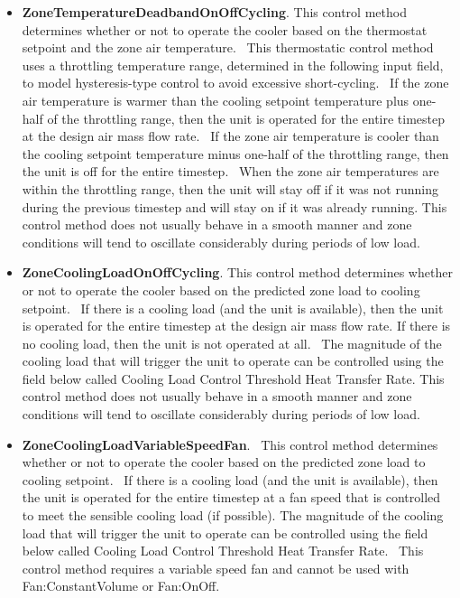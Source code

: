 \begin{itemize}
\item
  \textbf{ZoneTemperatureDeadbandOnOffCycling}. This control method determines whether or not to operate the cooler based on the thermostat setpoint and the zone air temperature.~ This thermostatic control method uses a throttling temperature range, determined in the following input field, to model hysteresis-type control to avoid excessive short-cycling.~ If the zone air temperature is warmer than the cooling setpoint temperature plus one-half of the throttling range, then the unit is operated for the entire timestep at the design air mass flow rate.~ If the zone air temperature is cooler than the cooling setpoint temperature minus one-half of the throttling range, then the unit is off for the entire timestep.~ When the zone air temperatures are within the throttling range, then the unit will stay off if it was not running during the previous timestep and will stay on if it was already running. This control method does not usually behave in a smooth manner and zone conditions will tend to oscillate considerably during periods of low load.
\item
  \textbf{ZoneCoolingLoadOnOffCycling}. This control method determines whether or not to operate the cooler based on the predicted zone load to cooling setpoint.~ If there is a cooling load (and the unit is available), then the unit is operated for the entire timestep at the design air mass flow rate. If there is no cooling load, then the unit is not operated at all.~ The magnitude of the cooling load that will trigger the unit to operate can be controlled using the field below called Cooling Load Control Threshold Heat Transfer Rate. This control method does not usually behave in a smooth manner and zone conditions will tend to oscillate considerably during periods of low load.
\item
  \textbf{ZoneCoolingLoadVariableSpeedFan}.~ This control method determines whether or not to operate the cooler based on the predicted zone load to cooling setpoint.~ If there is a cooling load (and the unit is available), then the unit is operated for the entire timestep at a fan speed that is controlled to meet the sensible cooling load (if possible). The magnitude of the cooling load that will trigger the unit to operate can be controlled using the field below called Cooling Load Control Threshold Heat Transfer Rate.~ This control method requires a variable speed fan and cannot be used with Fan:ConstantVolume or Fan:OnOff.
\end{itemize}

